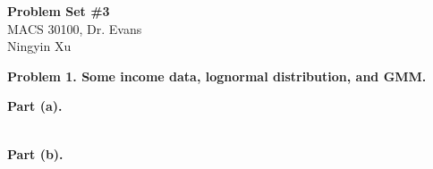 \documentclass[letterpaper,12pt]{article}
\theoremstyle{definition}
\begin{document}
\begin{flushleft}
  \textbf{\large{Problem Set \#3}} \\
  MACS 30100, Dr. Evans \\
  Ningyin Xu
\end{flushleft}

\vspace{5mm}

\noindent\textbf{Problem 1. Some income data, lognormal distribution, and GMM.}

\noindent\textbf{Part (a).} 
\begin{figure}[htb]\centering\captionsetup{width=4.0in}
  \label{Fig1a}
\end{figure}
\\
\noindent\textbf{Part (b).} 
\end{document}
